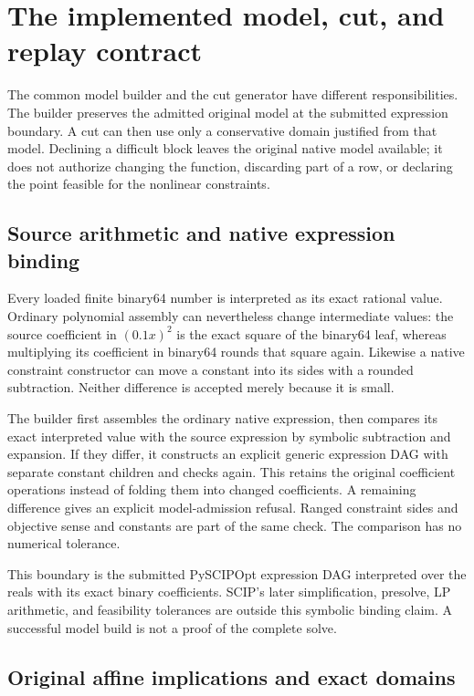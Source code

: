 \section{The implemented model, cut, and replay contract}\label{sec:implementation}

The common model builder and the cut generator have different responsibilities.
The builder preserves the admitted original model at the submitted expression
boundary. A cut can then use only a conservative domain justified from that
model. Declining a difficult block leaves the original native model available;
it does not authorize changing the function, discarding part of a row, or
declaring the point feasible for the nonlinear constraints.

\subsection{Source arithmetic and native expression binding}

Every loaded finite binary64 number is interpreted as its exact rational
value. Ordinary polynomial assembly can nevertheless change intermediate
values: the source coefficient in $(0.1x)^2$ is the exact square of the
binary64 leaf, whereas multiplying its coefficient in binary64 rounds that
square again. Likewise a native constraint constructor can move a constant
into its sides with a rounded subtraction. Neither difference is accepted
merely because it is small.

The builder first assembles the ordinary native expression, then compares
its exact interpreted value with the source expression by symbolic subtraction
and expansion. If they differ, it constructs an explicit generic expression
DAG with separate constant children and checks again. This retains the
original coefficient operations instead of folding them into changed
coefficients. A remaining difference gives an explicit model-admission
refusal. Ranged constraint sides and objective sense and constants are part
of the same check. The comparison has no numerical tolerance.

This boundary is the submitted PySCIPOpt expression DAG interpreted over
the reals with its exact binary coefficients. SCIP's later simplification,
presolve, LP arithmetic, and feasibility tolerances are outside this symbolic
binding claim. A successful model build is not a proof of the complete solve.

\subsection{Original affine implications and exact domains}

